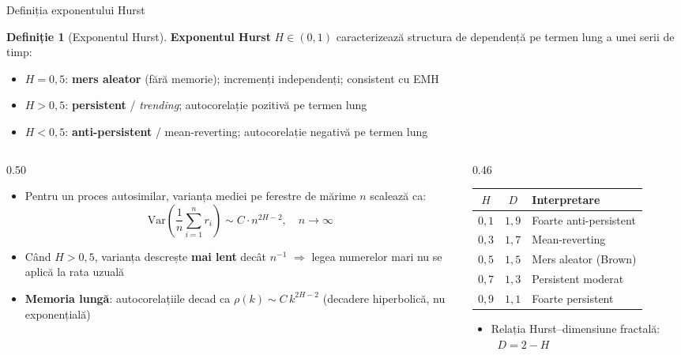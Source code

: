 \documentclass[9pt, aspectratio=169, t]{beamer}
\theoremstyle{definition}
\newtheorem{defn}{Definiție}
\newenvironment{cminipage}[1]{%
    \par\noindent\hfill\begin{minipage}{#1}\ignorespaces
}{%
    \end{minipage}\hfill\null\par
}
\newcommand{\Var}{\text{Var}}
\begin{document}
\begin{frame}[shrink=20]{Definiția exponentului Hurst}
\begin{cminipage}{0.95\textwidth}
\begin{defn}[Exponentul Hurst]
\textbf{Exponentul Hurst} $H \in (0, 1)$ caracterizează structura de dependență pe termen lung a unei serii de timp:
\begin{itemize}\setlength{\itemsep}{0pt}
    \item $H = 0{,}5$: \textbf{mers aleator} (fără memorie); incremenți independenți; consistent cu EMH
    \item $H > 0{,}5$: \textbf{persistent} / \textit{trending}; autocorelație pozitivă pe termen lung
    \item $H < 0{,}5$: \textbf{anti-persistent} / mean-reverting; autocorelație negativă pe termen lung
\end{itemize}
\end{defn}

\begin{columns}[T]
\begin{column}{0.50\textwidth}
\begin{itemize}\setlength{\itemsep}{0pt}
    \item Pentru un proces autosimilar, varianța mediei pe ferestre de mărime $n$ scalează ca:
    \[
        \Var\!\left(\frac{1}{n}\sum_{i=1}^n r_i\right) \sim C \cdot n^{2H - 2}, \quad n \to \infty
    \]
    \item Când $H > 0{,}5$, varianța descrește \textbf{mai lent} decât $n^{-1}$ $\Rightarrow$ legea numerelor mari nu se aplică la rata uzuală
    \item \textbf{Memoria lungă}: autocorelațiile decad ca $\rho(k) \sim C \, k^{2H-2}$ (decadere hiperbolică, nu exponențială)
\end{itemize}
\end{column}
\begin{column}{0.46\textwidth}
\centering
\renewcommand{\arraystretch}{1.3}
\begin{tabular}{ccl}
\toprule
$H$ & $D$ & \textbf{Interpretare} \\
\midrule
$0{,}1$ & $1{,}9$ & Foarte anti-persistent \\
$0{,}3$ & $1{,}7$ & Mean-reverting \\
$0{,}5$ & $1{,}5$ & Mers aleator (Brown) \\
$0{,}7$ & $1{,}3$ & Persistent moderat \\
$0{,}9$ & $1{,}1$ & Foarte persistent \\
\bottomrule
\end{tabular}

\vspace{0.3cm}

\begin{itemize}\setlength{\itemsep}{0pt}
    \item \small Relația Hurst--dimensiune fractală: $\;\boxed{\; D = 2 - H \;}\;$
\end{itemize}
\end{column}
\end{columns}
\end{cminipage}
\end{frame}
\end{document}
